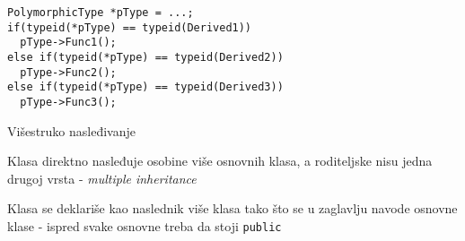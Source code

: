 \documentclass{article}
\newenvironment{xitemize}{%
    
    \itemize
    \larger
}{%
    \enditemize
}
\let\olditemize\itemize
\let\endolditemize\enditemize
\renewenvironment{itemize}{%
    \smaller
    \olditemize
}{%
    \endolditemize
}
\providecommand{\inlinecode}[1]{\texttt{#1}}
\begin{document}
\begin{xitemize}
\begin{itemize}
\begin{lstlisting}
PolymorphicType *pType = ...;
if(typeid(*pType) == typeid(Derived1))
  pType->Func1();
else if(typeid(*pType) == typeid(Derived2))
  pType->Func2();
else if(typeid(*pType) == typeid(Derived3))
  pType->Func3();
    \end{lstlisting}
\end{itemize}
\item Višestruko nasleđivanje
\begin{itemize}
    \item Klasa direktno nasleđuje osobine više osnovnih klasa, a roditeljske nisu jedna drugoj vrsta - \textit{multiple inheritance}
    \item Klasa se deklariše kao naslednik više klasa tako što se u zaglavlju navode osnovne klase - ispred svake osnovne treba da stoji \inlinecode{public}
    

\end{itemize}
\end{xitemize}
\end{document}
